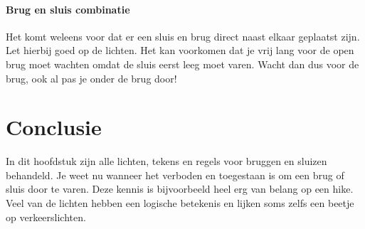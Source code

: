 \paragraph{Brug en sluis combinatie}
Het komt weleens voor dat er een sluis en brug direct naast elkaar geplaatst zijn. Let hierbij goed op de lichten. Het kan voorkomen dat je vrij lang voor de open brug moet wachten omdat de sluis eerst leeg moet varen. Wacht dan dus voor de brug, ook al pas je onder de brug door!

\section{Conclusie}
In dit hoofdstuk zijn alle lichten, tekens en regels voor bruggen en sluizen behandeld. Je weet nu wanneer het verboden en toegestaan is om een brug of sluis door te varen. Deze kennis is bijvoorbeeld heel erg van belang op een hike. Veel van de lichten hebben een logische betekenis en lijken soms zelfs een beetje op verkeerslichten. 
